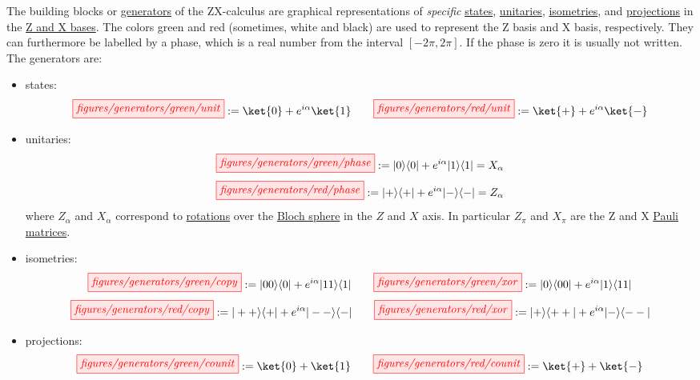 \documentclass[a4paper, 12pt]{article}
\begin{document}
The building blocks or \underline{generators} of the ZX-calculus are graphical
representations of \emph{specific} \underline{states}, \underline{unitaries},
\underline{isometries}, and \underline{projections} in the \underline{Z and X
  bases}.
The colors green and red (sometimes, white and black) are used to represent the
Z basis and X basis, respectively.
They can furthermore be labelled by a phase, which is a real number from the
interval $[-2\pi, 2\pi]$.
If the phase is zero it is usually not written.
The generators are:
\begin{itemize}
\item states:
  \begin{equation*}
    \tikzfig{figures/generators/green/unit} := \ket{0} + e^{i \alpha} \ket{1} 
    \qquad
    \tikzfig{figures/generators/red/unit} := \ket{+} + e^{i \alpha} \ket{-}
  \end{equation*}

\item unitaries:
  \begin{equation*}
    \tikzfig{figures/generators/green/phase} := | 0 \rangle \langle 0 | + e^{i \alpha} | 1 \rangle \langle 1 | = X_\alpha
  \end{equation*}
  \vspace{1mm}
  \begin{equation*}
    \tikzfig{figures/generators/red/phase} := | + \rangle \langle + | + e^{i \alpha} | - \rangle \langle - | = Z_\alpha
  \end{equation*}
  where $Z_\alpha$ and $X_\alpha$ correspond to \underline{rotations} over the
  \underline{Bloch sphere}  in the $Z$ and $X$ axis. In particular $Z_\pi$ and
  $X_\pi$ are the Z and X \underline{Pauli matrices}.

\item isometries:
  \begin{equation*}
    \tikzfig{figures/generators/green/copy} := | 00 \rangle \langle 0 | + e^{i \alpha} |11 \rangle \langle 1 |
    \qquad
    \tikzfig{figures/generators/green/xor} := | 0 \rangle \langle 00 | + e^{i \alpha} | 1 \rangle \langle 11 |
  \end{equation*}
  \begin{equation*}
    \tikzfig{figures/generators/red/copy} := | ++ \rangle \langle + | + e^{i \alpha} |-- \rangle \langle - |
    \qquad
    \tikzfig{figures/generators/red/xor} := | + \rangle \langle ++ | + e^{i \alpha} | - \rangle \langle -- |
  \end{equation*}

\item projections:
  \begin{equation*}
    \tikzfig{figures/generators/green/counit} := \ket{0} + \ket{1}
    \qquad
    \tikzfig{figures/generators/red/counit} := \ket{+} + \ket{-}
  \end{equation*}
\end{itemize}
\end{document}
